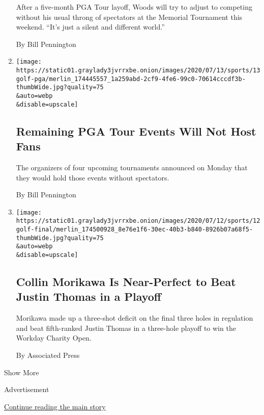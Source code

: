 \begin{enumerate}
  After a five-month PGA Tour layoff, Woods will try to adjust to
  competing without his usual throng of spectators at the Memorial
  Tournament this weekend. ``It's just a silent and different world.''

  By Bill Pennington
\item
  \href{/2020/07/13/sports/golf/pga-tour-schedule-fans.html}{}

  \texttt{[image: https://static01.graylady3jvrrxbe.onion/images/2020/07/13/sports/13golf-pga/merlin\_174445557\_1a259abd-2cf9-4fe6-99c0-70614cccdf3b-thumbWide.jpg?quality=75\\\&auto=webp\\\&disable=upscale]}

  \hypertarget{remaining-pga-tour-events-will-not-host-fans}{%
  \subsection{Remaining PGA Tour Events Will Not Host
  Fans}\label{remaining-pga-tour-events-will-not-host-fans}}

  The organizers of four upcoming tournaments announced on Monday that
  they would hold those events without spectators.

  By Bill Pennington
\item
  \href{/2020/07/12/sports/golf/workday-charity-tv-collin-morikawa-justin-thomas.html}{}

  \texttt{[image: https://static01.graylady3jvrrxbe.onion/images/2020/07/12/sports/12golf-final/merlin\_174500928\_8e76e1f6-30ec-40b3-b840-8926b07a68f5-thumbWide.jpg?quality=75\\\&auto=webp\\\&disable=upscale]}

  \hypertarget{collin-morikawa-is-near-perfect-to-beat-justin-thomas-in-a-playoff}{%
  \subsection{Collin Morikawa Is Near-Perfect to Beat Justin Thomas in a
  Playoff}\label{collin-morikawa-is-near-perfect-to-beat-justin-thomas-in-a-playoff}}

  Morikawa made up a three-shot deficit on the final three holes in
  regulation and beat fifth-ranked Justin Thomas in a three-hole playoff
  to win the Workday Charity Open.

  By Associated Press
\end{enumerate}

Show More

Advertisement

\protect\hyperlink{after-mid1}{Continue reading the main story}

